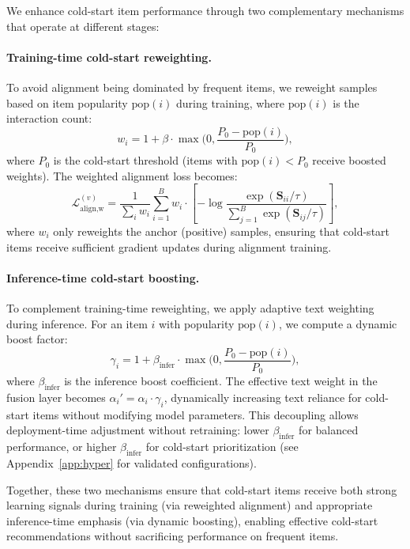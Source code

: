We enhance cold-start item performance through two complementary
mechanisms that operate at different stages:

\paragraph{Training-time cold-start reweighting.}
To avoid alignment being dominated by frequent items, we
reweight samples based on item popularity $\mathrm{pop}(i)$
during training, where $\mathrm{pop}(i)$ is the interaction count:
\begin{equation}
  w_i = 1 + \beta\cdot \max\Big(0, \frac{P_0-\mathrm{pop}(i)}{P_0}\Big),
\end{equation}
where $P_0$ is the cold-start threshold (items with $\mathrm{pop}(i) < P_0$
receive boosted weights). The weighted alignment loss becomes:
\begin{equation}
  \mathcal{L}_{\text{align,w}}^{(v)} =
  \frac{1}{\sum_i w_i}\sum_{i=1}^{B} w_i \cdot
  \left[-\log \frac{\exp(\mathbf{S}_{ii}/\tau)}{\sum_{j=1}^{B}\exp(\mathbf{S}_{ij}/\tau)}\right],
\end{equation}
where $w_i$ only reweights the anchor (positive) samples, ensuring
that cold-start items receive sufficient gradient updates during
alignment training.

\paragraph{Inference-time cold-start boosting.}
To complement training-time reweighting, we apply adaptive text
weighting during inference. For an item $i$ with popularity
$\mathrm{pop}(i)$, we compute a dynamic boost factor:
\begin{equation}
  \gamma_i = 1 + \beta_{\text{infer}} \cdot \max\Big(0, 
  \frac{P_0-\mathrm{pop}(i)}{P_0}\Big),
  \label{eq:infer_boost}
\end{equation}
where $\beta_{\text{infer}}$ is the inference boost coefficient.
The effective text weight in the fusion layer becomes 
$\alpha_i' = \alpha_i \cdot \gamma_i$, dynamically increasing text
reliance for cold-start items without modifying model parameters.
This decoupling allows deployment-time adjustment without
retraining: lower $\beta_{\text{infer}}$ for balanced performance,
or higher $\beta_{\text{infer}}$ for cold-start prioritization
(see Appendix~\ref{app:hyper} for validated configurations).

Together, these two mechanisms ensure that cold-start items receive
both strong learning signals during training (via reweighted
alignment) and appropriate inference-time emphasis (via dynamic
boosting), enabling effective cold-start recommendations without
sacrificing performance on frequent items.


